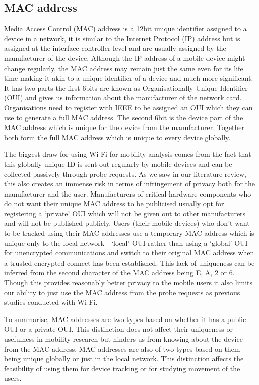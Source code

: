 \subsection{MAC address}
Media Access Control (MAC) address is a 12bit unique identifier assigned to a device in a network, it is similar to the Internet Protocol (IP) address but is assigned at the interface controller level and are usually assigned by the manufacturer of the device.
Although the IP address of a mobile device might change regularly, the MAC address may remain just the same even for its life time making it akin to a unique identifier of a device and much more significant.
It has two parts the first 6bits are known as Organisationally Unique Identifier (OUI) and gives us information about the manufacturer of the network card.
Organisations need to register with IEEE to be assigned an OUI which they can use to generate a full MAC address.
The second 6bit is the device part of the MAC address which is unique for the device from the manufacturer.
Together both form the full MAC address which is unique to every device globally.

The biggest draw for using Wi-Fi for mobility analysis comes from the fact that this globally unique ID is sent out regularly by mobile devices and can be collected passively through probe requests.
As we saw in our literature review, this also creates an immense risk in terms of infringement of privacy both for the manufacturer and the user.
Manufacturers of critical hardware components who do not want their unique MAC address to be publicised usually opt for registering a `private' OUI which will not be given out to other manufacturers and will not be published publicly.
Users (their mobile devices) who don't want to be tracked using their MAC addresses use a temporary MAC address which is unique only to the local network - `local' OUI rather than using a `global' OUI for unencrypted communications and switch to their original MAC address when a trusted encrypted connect has been established.
This lack of uniqueness can be inferred from the second character of the MAC address being E, A, 2 or 6.
Though this provides reasonably better privacy to the mobile users it also limits our ability to just use the MAC address from the probe requests as previous studies conducted with Wi-Fi.

To summarise, MAC addresses are two types based on whether it has a public OUI or a private OUI.
This distinction does not affect their uniqueness or usefulness in mobility research but hinders us from knowing about the device from the MAC address.
MAC addresses are also of two types based on them being unique globally or just in the local network.
This distinction affects the feasibility of using them for device tracking or for studying movement of the users.






